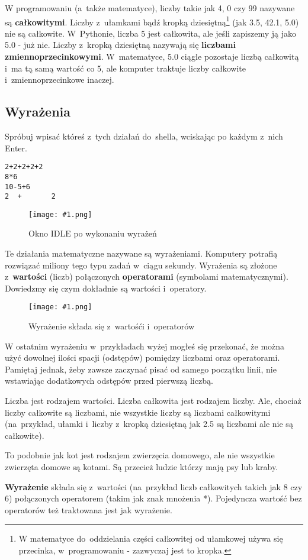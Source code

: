 \documentclass{book}
\newcommand{\img}[3]{
\begin{figure}
\centerline{
	\texttt{[image: \#1.png]}
}
\caption{#2}
\label{#1}
\end{figure}
}
\begin{document}
W programowaniu (a~także matematyce), liczby takie jak 4, 0 czy 99 nazywane są {\bf całkowitymi}. Liczby z~ułamkami bądź kropką dziesiętną\footnote{W matematyce do~oddzielania części całkowitej od ułamkowej używa się przecinka, w~programowaniu - zazwyczaj jest to kropka.} (jak 3.5, 42.1, 5.0) nie są całkowite. W~Pythonie, liczba 5 jest całkowita, ale jeśli zapiszemy ją jako 5.0 - już nie. Liczby z~kropką dziesiętną nazywają się {\bf liczbami zmiennoprzecinkowymi}. W~matematyce, 5.0 ciągle pozostaje liczbą całkowitą i~ma tą samą wartość co 5, ale komputer traktuje liczby całkowite i~zmiennoprzecinkowe inaczej.

\subsection{Wyrażenia}

Spróbuj wpisać któreś z~tych działań do~shella, wciskając po każdym z~nich Enter.

\begin{lstlisting}
2+2+2+2+2
8*6
10-5+6
2  +       2      
\end{lstlisting}

\img{idle-wyrazenia}{Okno IDLE po wykonaniu wyrażeń}{7 cm}

Te działania matematyczne nazywane są wyrażeniami. Komputery potrafią rozwiązać miliony tego typu zadań w~ciągu sekundy. Wyrażenia są złożone z~{\bf wartości} (liczb) połączonych {\bf operatorami} (symbolami matematycznymi). Dowiedzmy się czym dokładnie są wartości i~operatory.

\img{idle-wyroperwart}{Wyrażenie składa się z~wartośći i~operatorów}{3 cm}

W ostatnim wyrażeniu w~przykładach wyżej mogłeś się przekonać, że można użyć dowolnej ilości spacji (odstępów) pomiędzy liczbami oraz operatorami. Pamiętaj jednak, żeby zawsze zaczynać pisać od samego początku linii, nie wstawiając dodatkowych odstępów przed pierwszą liczbą.

Liczba jest rodzajem wartości. Liczba całkowita jest rodzajem liczby. Ale, chociaż liczby całkowite są liczbami, nie wszystkie liczby są liczbami całkowitymi (na~przykład, ułamki i~liczby z~kropką dziesiętną jak 2.5 są liczbami ale nie są całkowite).

To podobnie jak kot jest rodzajem zwierzęcia domowego, ale nie wszystkie zwierzęta domowe są kotami. Są przecież ludzie którzy mają psy lub kraby. 

{\bf Wyrażenie} składa się z~wartości (na~przykład liczb całkowitych takich jak 8 czy 6) połączonych operatorem (takim jak znak mnożenia *). Pojedyncza wartość bez operatorów też traktowana jest jak wyrażenie.
\end{document}
